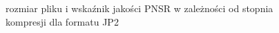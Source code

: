 \documentclass{article}
\begin{document}
\renewcommand{\ww}{0.5}
\begin{figure}
    \captionsetup[subfloat]{position=bottom,labelformat=empty} %
    
     \hfill%
     \hfill%

    \caption{rozmiar pliku i wskaźnik jakości PNSR w zależności od stopnia kompresji dla formatu JP2} %
    \label{fig:fig1}
\end{figure}
\end{document}
